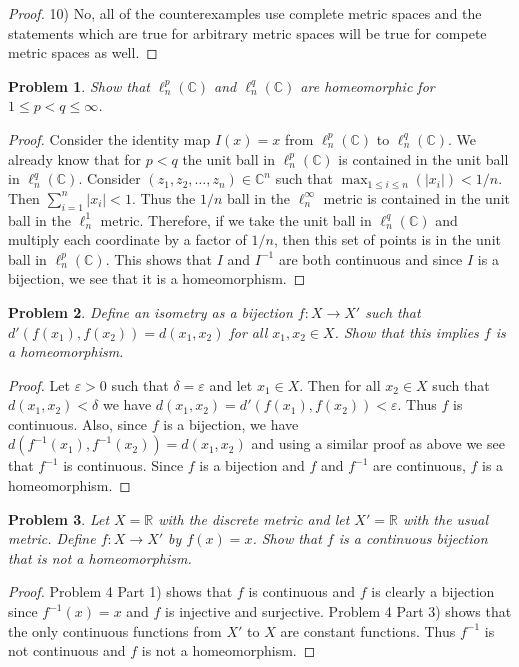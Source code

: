 \documentclass{article}
\newtheorem{problem}{Problem}
\begin{document}
\begin{flushleft}
\begin{proof}
10) No, all of the counterexamples use complete metric spaces and the statements which are true for arbitrary metric spaces will be true for compete metric spaces as well.
\end{proof}

\begin{problem}
Show that $\ell_n^p (\mathbb{C})$ and $\ell_n^q (\mathbb{C})$ are homeomorphic for $1 \leq p < q \leq \infty$.
\end{problem}
\begin{proof}
Consider the identity map $I(x) = x$ from $\ell_n^p (\mathbb{C})$ to $\ell_n^q (\mathbb{C})$. We already know that for $p < q$ the unit ball in $\ell_n^p (\mathbb{C})$ is contained in the unit ball in $\ell_n^q (\mathbb{C})$. Consider $(z_1, z_2, \dots , z_n) \in \mathbb{C}^n$ such that $\max_{1 \leq i \leq n} (|x_i|) < 1/n$. Then $\sum_{i=1}^{n} |x_i| < 1$. Thus the $1/n$ ball in the $\ell_n^{\infty}$ metric is contained in the unit ball in the $\ell_n^1$ metric. Therefore, if we take the unit ball in $\ell_n^q (\mathbb{C})$ and multiply each coordinate by a factor of $1/n$, then this set of points is in the unit ball in $\ell_n^p (\mathbb{C})$. This shows that $I$ and $I^{-1}$ are both continuous and since $I$ is a bijection, we see that it is a homeomorphism.
\end{proof}

\begin{problem}
Define an isometry as a bijection $f : X \rightarrow X'$ such that $d'(f(x_1), f(x_2)) = d(x_1, x_2)$ for all $x_1, x_2 \in X$. Show that this implies $f$ is a homeomorphism.
\end{problem}
\begin{proof}
Let $\varepsilon > 0$ such that $\delta = \varepsilon$ and let $x_1 \in X$. Then for all $x_2 \in X$ such that $d(x_1, x_2) < \delta$ we have $d(x_1, x_2) = d'(f(x_1), f(x_2)) < \varepsilon$. Thus $f$ is continuous. Also, since $f$ is a bijection, we have $d(f^{-1}(x_1), f^{-1}(x_2)) = d(x_1, x_2)$ and using a similar proof as above we see that $f^{-1}$ is continuous. Since $f$ is a bijection and $f$ and $f^{-1}$ are continuous, $f$ is a homeomorphism.
\end{proof}

\begin{problem}
Let $X = \mathbb{R}$ with the discrete metric and let $X' = \mathbb{R}$ with the usual metric. Define $f : X \rightarrow X'$ by $f(x) = x$. Show that $f$ is a continuous bijection that is not a homeomorphism.
\end{problem}
\begin{proof}
Problem 4 Part 1) shows that $f$ is continuous and $f$ is clearly a bijection since $f^{-1}(x) = x$ and $f$ is injective and surjective. Problem 4 Part 3) shows that the only continuous functions from $X'$ to $X$ are constant functions. Thus $f^{-1}$ is not continuous and $f$ is not a homeomorphism.
\end{proof}


\end{flushleft}
\end{document}
